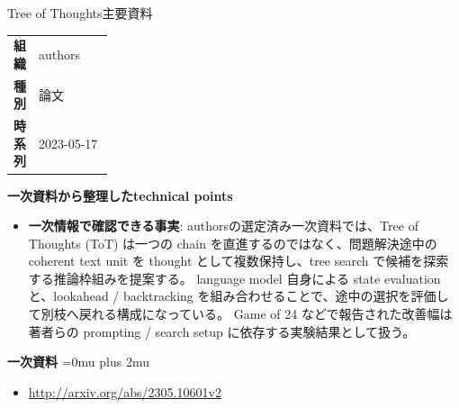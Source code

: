 \begin{technicalnote}{Tree of Thoughts}{主要資料}
\begingroup
\begin{tabularx}{\linewidth}{@{}>{\bfseries}p{0.22\linewidth}X@{}}
組織 & authors \\
種別 & 論文 \\
時系列 & 2023-05-17 \\
\end{tabularx}
\smallskip
{\bfseries 一次資料から整理したtechnical points}
\begin{itemize}[leftmargin=1.5em,itemsep=0.35em]
\item \textbf{一次情報で確認できる事実}: authorsの選定済み一次資料では、Tree of Thoughts (ToT) は一つの chain を直進するのではなく、問題解決途中の coherent text unit を thought として複数保持し、tree search で候補を探索する推論枠組みを提案する。 language model 自身による state evaluation と、lookahead / backtracking を組み合わせることで、途中の選択を評価して別枝へ戻れる構成になっている。 Game of 24 などで報告された改善幅は著者らの prompting / search setup に依存する実験結果として扱う。
\end{itemize}
\begin{minipage}{\linewidth}
\begin{samepage}
{\bfseries 一次資料}
\begingroup\sloppy
\Urlmuskip=0mu plus 2mu\relax
\begin{itemize}[leftmargin=1.5em,itemsep=0.25em]
\item {\scriptsize\url{http://arxiv.org/abs/2305.10601v2}}
\end{itemize}
\endgroup
\end{samepage}
\end{minipage}
\endgroup
\end{technicalnote}
\medskip

